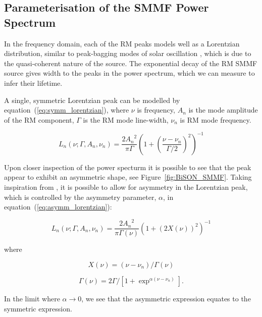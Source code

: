 \subsection{Parameterisation of the SMMF Power Spectrum}

In the frequency domain, each of the RM peaks models well as a Lorentzian distribution, similar to peak-bagging modes of solar oscillation \citep{handberg_bayesian_2011, davies_low-frequency_2014}, which is due to the quasi-coherent nature of the source. The exponential decay of the RM SMMF source gives width to the peaks in the power spectrum, which we can measure to infer their lifetime.

A single, symmetric Lorentzian peak can be modelled by equation~(\ref{eq:symm_lorentzian}), where $\nu$ is frequency, $A_n$ is the mode amplitude of the RM component, $\Gamma$ is the RM mode line-width, $\nu_n$ is RM mode frequency.

\begin{equation}
L_n(\nu; \Gamma, A_n, \nu_n) = \frac{2{A_n}^2}{\pi \Gamma} \left(1 + \left(\frac{\nu - \nu_{n}}{\Gamma /2}\right)^2\right)^{-1} 
\label{eq:symm_lorentzian}
\end{equation}

Upon closer inspection of the power specturm it is possible to see that the peak appear to exhibit an asymmetric shape, see Figure~\ref{fig:BiSON_SMMF}. Taking inspiration from \citep{howe_solar_2020}, it is possible to allow for asymmetry in the Lorentzian peak, which is controlled by the asymmetry parameter, $\alpha$, in equation~(\ref{eq:asymm_lorentzian}):

\begin{equation}
L_n(\nu; \Gamma, A_n, \nu_n) = \frac{2{A_n}^2}{\pi \Gamma(\nu)} \left(1 + \left(2X(\nu)\right)^2\right)^{-1} 
\label{eq:asymm_lorentzian}
\end{equation}

where

\begin{equation}
X(\nu) = (\nu - \nu_n)/\Gamma(\nu)
\label{eq:asymm_freq}
\end{equation}

\begin{equation}
\Gamma(\nu) = 2\Gamma / [1 + \exp^{\alpha(\nu - \nu_n)}] .
\label{eq:asymm_width}
\end{equation}

In the limit where $\alpha \rightarrow 0$, we see that the asymmetric expression equates to the symmetric expression.

